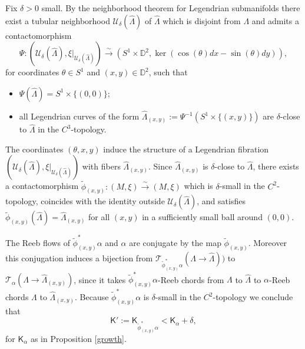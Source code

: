 \documentclass[JEP,XML,SOM,Unicode,NoFloatCountersInSection]{cedram}
\let\mathcal\mathscr
\let\ra\rightarrow
\newcommand{\isom}{\stackrel\sim\longrightarrow}
\theoremstyle{plain}
\theoremstyle{definition}
\numberwithin{equation}{subsection}
\begin{document}
Fix $\delta>0$ small. By the neighborhood theorem for Legendrian submanifolds there exist a tubular neighborhood $\mathcal{U}_\delta(\widehat{\Lambda})$
of $\widehat{\Lambda}$ which is disjoint from $\Lambda$ and admits a contactomorphism
$$\Psi:(\mathcal{U}_\delta(\widehat{\Lambda}), \xi |_{\mathcal{U}_\delta(\widehat{\Lambda})})\isom (S^1 \times \mathbb{D}^2, \ker (\cos (\theta) dx - \sin (\theta) dy)),$$ for coordinates $\theta \in S^1$ and $(x,y) \in \mathbb{D}^2$, such that
\begin{itemize}
\item $\Psi(\widehat{\Lambda}) = S^1 \times \{(0,0)\}$;
\item all Legendrian curves of the form $\widehat{\Lambda}_{(x,y)}:=\Psi^{-1}(S^1 \times \{(x,y)\}) $ are $\delta$-close to $\widehat{\Lambda}$ in the $C^3$-topology.
\end{itemize}
The coordinates $(\theta\!,x,y)$ induce the structure of a Legendrian fibration $(\mathcal{U}_\delta(\widehat{\Lambda}), \xi |_{\mathcal{U}_\delta(\widehat{\Lambda})})$ with fibers $\widehat{\Lambda}_{(x,y)}$. Since $\widehat{\Lambda}_{(x,y)}$ is $\delta$-close to $\widehat{\Lambda}$, there exists a contactomorphism $\widetilde{\phi}_{(x,y)} : (M,\xi) \isom (M,\xi)$ which is $\delta$-small in the $C^2$-topology, coincides with the identity outside $\mathcal{U}_\delta(\widehat{\Lambda})$, and satisfies $\widetilde{\phi}_{(x,y)} (\widehat{\Lambda}) = \widehat{\Lambda}_{(x,y)}$ for all $(x,y)$ in a sufficiently small ball around $(0,0)$.

The Reeb flows of $\widetilde{\phi}_{(x,y)}^* \alpha$ and $\alpha$ are conjugate by the map $\widetilde{\phi}_{(x,y)}$. Moreover this conjugation induces a bijection from $\mathcal{T}_{\widetilde{\phi}_{(x,y)}^*\alpha}(\Lambda\ra \widehat{\Lambda}))$ to $\mathcal{T}_\alpha(\Lambda\ra \widehat{\Lambda}_{(x,y)})$, since it takes $\widetilde{\phi}_{(x,y)}^*\alpha$-Reeb chords from $\Lambda$ to $\widehat{\Lambda}$ to $\alpha$-Reeb chords $\Lambda$ to $\widehat{\Lambda}_{(x,y)}$. Because $\widetilde{\phi}_{(x,y)}^* \alpha$ is $\delta$-small in the $C^2$-topology we conclude that
\begin{equation}
\mathsf{K}':=\mathsf{K}_{\widetilde{\phi}_{(x,y)}^* \alpha} < \mathsf{K}_{\alpha} + \delta,
\end{equation}
for $\mathsf{K}_{\alpha}$ as in Proposition \ref{growth}.
\end{document}
